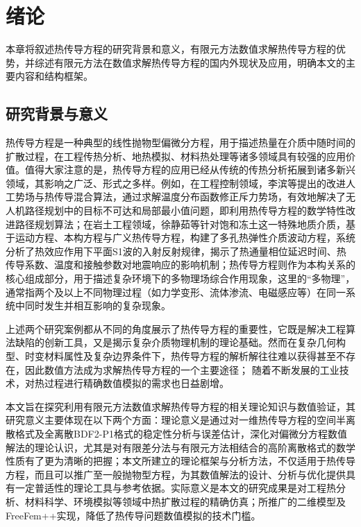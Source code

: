 \documentclass{GZUbachelorthesis}
\theoremstyle{chineseplain}
\begin{document}
\section{绪论}
本章将叙述热传导方程的研究背景和意义，有限元方法数值求解热传导方程的优势，并综述有限元方法在数值求解热传导方程的国内外现状及应用，明确本文的主要内容和结构框架。
\subsection{研究背景与意义}
热传导方程是一种典型的线性抛物型偏微分方程，用于描述热量在介质中随时间的扩散过程，在工程传热分析、地热模拟、材料热处理等诸多领域具有较强的应用价值。值得大家注意的是，热传导方程的应用已经从传统的传热分析拓展到诸多新兴领域，其影响之广泛、形式之多样。例如，在工程控制领域，李滨等\cite{li2026improved}提出的改进人工势场与热传导混合算法，通过求解温度分布函数修正斥力势场，有效地解决了无人机路径规划中的目标不可达和局部最小值问题，即利用热传导方程的数学特性改进路径规划算法；在岩土工程领域，徐静茹等\cite{xu2025thermal}针对饱和冻土这一特殊地质介质，基于运动方程、本构方程与广义热传导方程，构建了多孔热弹性介质波动方程，系统分析了热效应作用下平面S1波的入射反射规律，揭示了热通量相位延迟时间、热传导系数、温度和接触参数对地震响应的影响机制；热传导方程则作为本构关系的核心组成部分，用于描述复杂环境下的多物理场综合作用现象，这里的“多物理”，通常指两个及以上不同物理过程（如力学变形、流体渗流、电磁感应等）在同一系统中同时发生并相互影响的复杂现象。

上述两个研究案例都从不同的角度展示了热传导方程的重要性，它既是解决工程算法缺陷的创新工具，又是揭示复杂介质物理机制的理论基础。然而在复杂几何构型、时变材料属性及复杂边界条件下，热传导方程的解析解往往难以获得甚至不存在，因此数值方法成为求解热传导方程的一个主要途径； 随着不断发展的工业技术，对热过程进行精确数值模拟的需求也日益剧增。

本文旨在探究利用有限元方法数值求解热传导方程的相关理论知识与数值验证，其研究意义主要体现在以下两个方面：理论意义是通过对一维热传导方程的空间半离散格式及全离散BDF2-P1格式的稳定性分析与误差估计，深化对偏微分方程数值解法的理论认识，尤其是对有限差分法与有限元方法相结合的高阶离散格式的数学性质有了更为清晰的把握；本文所建立的理论框架与分析方法，不仅适用于热传导方程，而且可以推广至一般抛物型方程，为其数值解法的设计、分析与优化提供具有一定普适性的理论工具与参考依据。实际意义是本文的研究成果是对工程热分析、材料科学、环境模拟等领域中热扩散过程的精确仿真；所推广的二维模型及FreeFem++实现，降低了热传导问题数值模拟的技术门槛。
\end{document}
